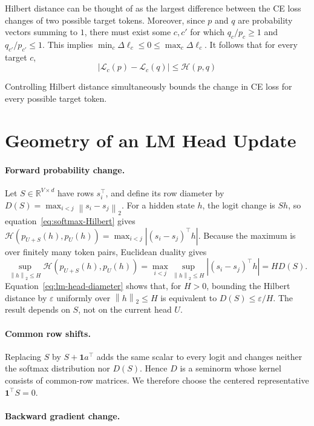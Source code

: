 \documentclass[anon]{opt2026} %
\newcommand{\R}{\mathbb{R}}
\newcommand{\one}{\mathbf{1}}
\newcommand{\norm}[1]{\left\lVert #1\right\rVert}
\newcommand{\abs}[1]{\left\lvert #1\right\rvert}
\begin{document}
Hilbert distance can be thought of as the largest difference between the CE loss changes of two possible target tokens. Moreover, since $p$ and $q$ are probability vectors summing to $1$, there must exist some $c, c'$ for which $q_c/p_c \geq 1$ and $q_{c'}/p_{c'} \leq 1$. This implies \(\min_c \Delta\ell_c \leq 0 \leq \max_c \Delta\ell_c\). It follows that for every target $c$,
\[
\boxed{
\left|\mathcal{L}_c(p) - \mathcal{L}_c(q)\right| \leq \mathcal{H}(p, q)
}
\]

Controlling Hilbert distance simultaneously bounds the change in CE loss for every possible target token.


\section{Geometry of an LM Head Update}
\label{sec:head-geometry}

\paragraph{Forward probability change.}

Let $S\in\R^{V\times d}$ have rows $s_i^\top$, and define its row diameter by $D(S)=\max_{i<j}\norm{s_i-s_j}_2$. For a hidden state $h$, the logit change is $Sh$, so equation~\ref{eq:softmax-Hilbert} gives $\mathcal H(p_{U+S}(h),p_U(h)) =\max_{i<j}\abs{(s_i-s_j)^\top h}$. Because the maximum is over finitely many token pairs, Euclidean duality gives
\begin{equation}
\boxed{
\sup_{\norm{h}_2\leq H}
\mathcal H\!\left(p_{U+S}(h),p_U(h)\right)
=
\max_{i<j}\sup_{\norm{h}_2\leq H}
\abs{(s_i-s_j)^\top h}
=
H D(S).
}
\label{eq:lm-head-diameter}
\end{equation}
Equation~\ref{eq:lm-head-diameter} shows that, for $H>0$, bounding the Hilbert distance by $\varepsilon$ uniformly over $\norm{h}_2\leq H$ is equivalent to $D(S)\leq\varepsilon/H$. The result depends on $S$, not on the current head $U$.


\paragraph{Common row shifts.}
Replacing $S$ by $S+\one a^\top$ adds the same scalar to every logit and changes neither the softmax distribution nor $D(S)$. Hence $D$ is a seminorm whose kernel consists of common-row matrices. We therefore choose the centered representative $\one^\top S=0$.


\paragraph{Backward gradient change.}
\label{sec:backward-change}
\end{document}

